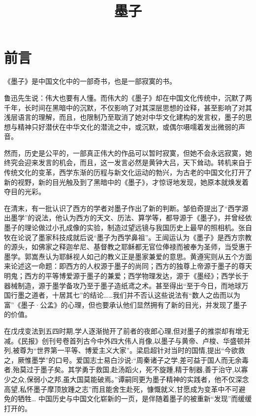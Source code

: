 \documentclass[12pt,UTF8]{ctexbook}
\title{\heiti\zihao{0} 墨子}
\author{}
\date{}
\begin{document}
\maketitle
\tableofcontents

\frontmatter
\chapter{前言}

《墨子》是中国文化中的一部奇书，也是一部寂寞的书。

鲁迅先生说：伟大也要有人懂。而伟大的《墨子》却在中国文化传统中，沉默了两千年，长时间在黑暗中的沉默，不仅影响了对其深层思想的诠释，甚至影响了对其浅层语言的理解，而且，也限制乃至取消了她对中华文化建构的发言权，墨子的思想与精神只好潜伏在中华文化的潜流之中，或沉默，或偶尔嗫嚅着发出微弱的声音。

然而，历史是公平的，一部真正伟大的作品可以暂时寂寞，但她不会永远寂寞，她终究会迎来发言的机会，而且，这一发言必然是黄钟大吕，天下耸动。转机来自于传统文化的变革，西学东渐的历程与新文化运动的勃兴，为古老的中国文化打开了新的视野，新的目光触及到了黑暗中的《墨子》，才惊讶地发现，她原本就焕发着夺目的光彩。

在清末，有一批认识了西方的学者对墨子作出了新的判断。邹伯奇提出了“西学源出墨学”的说法，他认为西方的天文、历法、算学等，都导源于《墨子》，并曾经依墨子的理论做过小孔成像的实验，制造过望远镜与我国历史上最早的照相机。张自牧在论说了墨家科技成就后说“墨子为西学鼻祖”。王闿运认为《墨子》是西方宗教的源头，如佛家之释迦牟尼、基督教之耶稣都无官位俸禄而被奉为圣师，当受惠于墨学。郭嵩焘认为耶稣视人如己的教义正是墨家兼爱的意思。黄遵宪则从五个方面来论述这一命题：即西方的人权源于墨子的尚同；西方的独尊上帝源于墨子的尊天明鬼；西方的平等博爱源于墨子的兼爱；西学物理发达，源于《墨经》；西学长于器械制造，源于墨学备攻乃至于墨子造纸鸢之术。甚至得出“至于今日，而地球万国行墨之道者，十居其七”的结论……我们并不否认这些说法有“数人之齿而以为富”《墨子·公孟》的心理，但也要承认他们显然拥有了新的目光，并发现了墨子的价值。

在戊戌变法到五四时期,学人逐渐抛开了前者的夜郎心理,但对墨子的推崇却有增无减。《民报》创刊号卷首列古今中外四大伟人肖像,以墨子与黄帝、卢梭、华盛顿并列,被尊为“世界第一平等、博爱主义大家”。梁启超针对当时的国情,提出“今欲救之，厥惟墨学”的口号。爱国志士易白沙说:“周秦诸子之学,差可益于国人而无余毒者,殆莫过于墨子矣。其学勇于救国,赴汤蹈火，死不旋踵,精于制器,善于治守,以寡少之众,保弱小之邦,虽大国莫能破焉。”谭嗣同更为墨子精神的实践者，他不仅深念高望,私怀墨子摩顶放踵之志”而且能舍生赴死，慷慨就义,甘愿成为变革中不可避免的牺牲…
中国历史与中国文化崭新的一页，是伴随着墨子的被重新“发现”而缓缓打开的。
\end{document}
